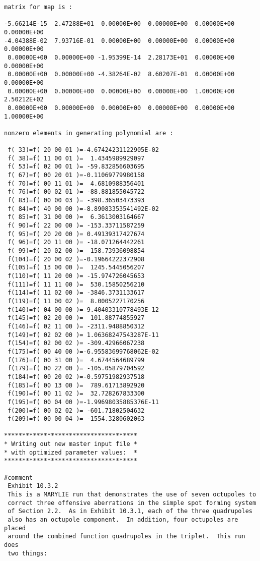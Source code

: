 \begin{footnotesize}
\begin{verbatim}
matrix for map is :

-5.66214E-15  2.47288E+01  0.00000E+00  0.00000E+00  0.00000E+00  0.00000E+00
-4.04388E-02  7.93716E-01  0.00000E+00  0.00000E+00  0.00000E+00  0.00000E+00
 0.00000E+00  0.00000E+00 -1.95399E-14  2.28173E+01  0.00000E+00  0.00000E+00
 0.00000E+00  0.00000E+00 -4.38264E-02  8.60207E-01  0.00000E+00  0.00000E+00
 0.00000E+00  0.00000E+00  0.00000E+00  0.00000E+00  1.00000E+00  2.50212E+02
 0.00000E+00  0.00000E+00  0.00000E+00  0.00000E+00  0.00000E+00  1.00000E+00

nonzero elements in generating polynomial are :

 f( 33)=f( 20 00 01 )=-4.67424231122905E-02
 f( 38)=f( 11 00 01 )=  1.4345989929097
 f( 53)=f( 02 00 01 )= -59.832856603695
 f( 67)=f( 00 20 01 )=-0.11069779980158
 f( 70)=f( 00 11 01 )=  4.6810988356401
 f( 76)=f( 00 02 01 )= -88.881855045722
 f( 83)=f( 00 00 03 )= -398.36503473393
 f( 84)=f( 40 00 00 )=-8.89083353541492E-02
 f( 85)=f( 31 00 00 )=  6.3613003164667
 f( 90)=f( 22 00 00 )= -153.33711587259
 f( 95)=f( 20 20 00 )= 0.49139317427674
 f( 96)=f( 20 11 00 )= -18.071264442261
 f( 99)=f( 20 02 00 )=  158.73936098854
 f(104)=f( 20 00 02 )=-0.19664222372908
 f(105)=f( 13 00 00 )=  1245.5445056207
 f(110)=f( 11 20 00 )= -15.974726045653
 f(111)=f( 11 11 00 )=  530.15850256210
 f(114)=f( 11 02 00 )= -3846.3731133617
 f(119)=f( 11 00 02 )=  8.0005227170256
 f(140)=f( 04 00 00 )=-9.40403310778493E-12
 f(145)=f( 02 20 00 )=  101.88774855927
 f(146)=f( 02 11 00 )= -2311.9488850312
 f(149)=f( 02 02 00 )= 1.06368247543287E-11
 f(154)=f( 02 00 02 )= -309.42966067238
 f(175)=f( 00 40 00 )=-6.95583699768062E-02
 f(176)=f( 00 31 00 )=  4.6744564689799
 f(179)=f( 00 22 00 )= -105.05879704592
 f(184)=f( 00 20 02 )=-0.59751982937518
 f(185)=f( 00 13 00 )=  789.61713892920
 f(190)=f( 00 11 02 )=  32.728267833300
 f(195)=f( 00 04 00 )=-1.99698035885376E-11
 f(200)=f( 00 02 02 )= -601.71802504632
 f(209)=f( 00 00 04 )= -1554.3280602063

*************************************
* Writing out new master input file *
* with optimized parameter values:  *
*************************************

#comment
 Exhibit 10.3.2
 This is a MARYLIE run that demonstrates the use of seven octupoles to
 correct three offensive aberrations in the simple spot forming system
 of Section 2.2.  As in Exhibit 10.3.1, each of the three quadrupoles
 also has an octupole component.  In addition, four octupoles are placed
 around the combined function quadrupoles in the triplet.  This run does
 two things:


\end{verbatim}
\end{footnotesize}

